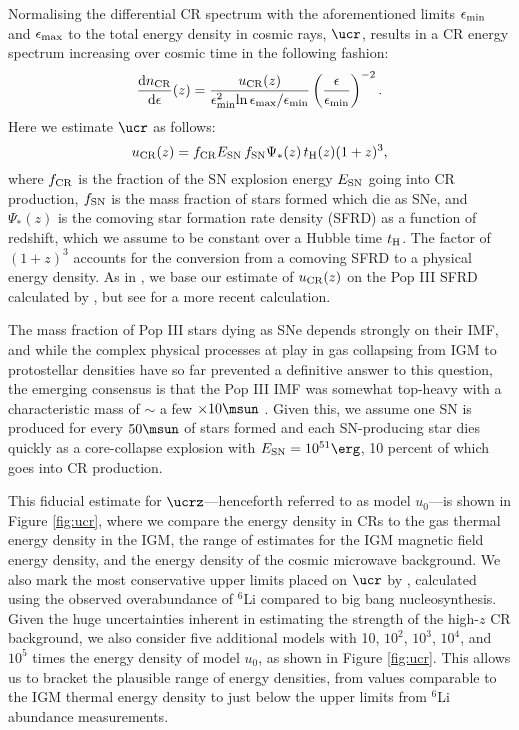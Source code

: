 Normalising the differential CR spectrum with the aforementioned limits $\epsilon_{\rm min}$ and $\epsilon_{\rm max}$ to the total energy density in cosmic rays, $\ucr$, results in a CR energy spectrum increasing over cosmic time in the following fashion:
 \begin{equation}
 \frac{{\rm d}n_{\rm \small CR}}{{\rm d}\epsilon}(z) = \frac{u_{\rm \small CR}(z)}{\epsilon_{\rm min}^2{\rm ln}\,\epsilon_{\rm max}{\large /}\epsilon_{\rm min}}  \left( \frac{\epsilon}{\epsilon_{\rm min}} \right)^{-2}.
 \end{equation}
Here we estimate $\ucr$ as follows:
\begin{equation}
u_{\rm \small CR}(z) = f_{\rm \small CR} E_{\rm \small SN}\, f_{\rm \small SN} \Psi_{*}(z)\, t_{\rm \small H}(z) (1+z)^3,
\end{equation}
where $f_{\rm \small CR}$ is the fraction of the SN explosion energy $E_{\rm \small SN}$ going into CR production, $f_{\rm \small SN}$ is the mass fraction of stars formed which die as SNe, and $\Psi_{*}(z)$ is the comoving star formation rate density (SFRD) as a function of redshift, which we assume to be constant over a Hubble time $t_{\rm \small H}$. The factor of $(1+z)^3$ accounts for the conversion from a comoving SFRD to a physical energy density. As in \citet{Hummeletal2015}, we base our estimate of $u_{\rm \small CR}(z)$ on the Pop III SFRD calculated by \citet{GreifBromm2006}, but see \citet{Campisietal2011} for a more recent calculation. 

The mass fraction of Pop III stars dying as SNe depends strongly on their IMF, and while the complex physical processes at play in gas collapsing from IGM to protostellar densities have so far prevented a definitive answer to this question, the emerging consensus is that the Pop III IMF was somewhat top-heavy with a characteristic mass of $\sim$ a few $\times 10\msun$ \citep{Bromm2013}.  Given this, we assume one SN is produced for every $50\msun$ of stars formed and each SN-producing star dies quickly as a core-collapse explosion with $E_{\rm \small SN} = 10^{51}\erg$, 10 percent of which goes into CR production.  

This fiducial estimate for $\ucrz$---henceforth referred to as model $u_0$---is shown in Figure \ref{fig:ucr}, where we compare the energy density in CRs to the gas thermal energy density in the IGM, the range of estimates for the IGM magnetic field energy density, and the energy density of the cosmic microwave background. We also mark the most conservative upper limits placed on $\ucr$ by \citet{RollindeVangioniOlive2006}, calculated using the observed overabundance of $^6$Li compared to big bang nucleosynthesis. Given the huge uncertainties inherent in estimating the strength of the high-$z$ CR background, we also consider five additional models with 10, $10^2$, $10^3$, $10^4$, and $10^5$ times the energy density of model $u_0$, as shown in Figure \ref{fig:ucr}.  This allows us to bracket the plausible range of energy densities, from values comparable to the IGM thermal energy density to just below the upper limits from $^6$Li abundance measurements.
 